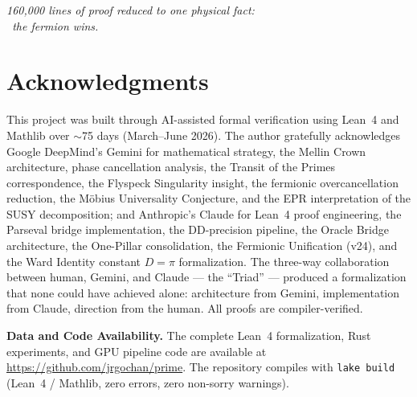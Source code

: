 \documentclass[11pt,a4paper]{article}
\begin{document}
\begin{flushright}
\emph{160{,}000 lines of proof reduced to one physical fact:\\\
the fermion wins.}
\end{flushright}

\section*{Acknowledgments}

This project was built through AI-assisted formal verification using
Lean~4 and Mathlib over $\sim$75 days (March--June 2026). The author
gratefully acknowledges Google DeepMind's Gemini for mathematical
strategy, the Mellin Crown architecture, phase cancellation
analysis, the Transit of the Primes correspondence, the
Flyspeck Singularity insight, the fermionic overcancellation
reduction, the M\"obius Universality Conjecture, and the EPR
interpretation of the SUSY decomposition;
and Anthropic's Claude for Lean~4 proof engineering,
the Parseval bridge implementation, the DD-precision pipeline,
the Oracle Bridge architecture, the One-Pillar consolidation,
the Fermionic Unification (v24), and the Ward Identity
constant $D = \pi$ formalization.
The three-way collaboration between human, Gemini, and Claude ---
the ``Triad'' --- produced a formalization that none could have
achieved alone: architecture from Gemini, implementation from Claude,
direction from the human.
All proofs are compiler-verified.

\medskip\noindent
\textbf{Data and Code Availability.}
The complete Lean~4 formalization, Rust experiments, and GPU
pipeline code are available at
\url{https://github.com/jrgochan/prime}.
The repository compiles with \texttt{lake build} (Lean~4 /
Mathlib, zero errors, zero non-sorry warnings).
\end{document}
